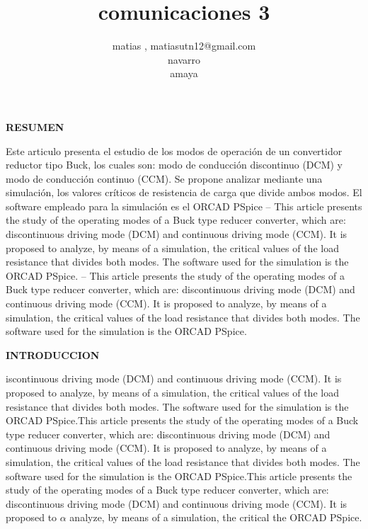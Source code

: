 \documentclass[10pt,a4paper]{article}
\author{matias , matiasutn12@gmail.com \\ navarro \\amaya \\ }
\title{comunicaciones 3}
\date{} %
\begin{document}
\maketitle  %
\begin{multicols}{2} %

\begin{center}
\textbf{RESUMEN }
\end{center}
Este articulo presenta el estudio de los modos de operación de un convertidor reductor tipo Buck, los cuales son: modo de conducción discontinuo (DCM) y modo de conducción continuo (CCM). Se propone analizar mediante una simulación, los valores críticos de resistencia de carga que divide ambos modos. El software empleado para la simulación es el ORCAD PSpice
– This article presents the study of the operating modes of a Buck type reducer converter, which are: discontinuous driving mode (DCM) and continuous driving mode (CCM). It is proposed to analyze, by means of a simulation, the critical values of the load resistance that divides both modes. The software used for the simulation is the ORCAD PSpice.
– This article presents the study of the operating modes of a Buck type reducer converter, which are: discontinuous driving mode (DCM) and continuous driving mode (CCM). It is proposed to analyze, by means of a simulation, the critical values of the load resistance that divides both modes. The software used for the simulation is the ORCAD PSpice.

\begin{center}  %
\textbf{INTRODUCCION}

\end{center} %
iscontinuous driving mode (DCM) and continuous driving mode (CCM). It is proposed to analyze, by means of a simulation, the critical values of the load resistance that divides both modes. The software used for the simulation is the ORCAD PSpice.This article presents the study of the operating modes of a Buck type reducer converter, which are: discontinuous driving mode (DCM) and continuous driving mode (CCM). It is proposed to analyze, by means of a simulation, the critical values of the load resistance that divides both modes. The software used for the simulation is the ORCAD PSpice.This article presents the study of the operating modes of a Buck type reducer converter, which are: discontinuous driving mode (DCM) and continuous driving mode (CCM). It is proposed to 
$\alpha$ analyze, by means of a simulation, the critical  the ORCAD PSpice.


\end{multicols}
\end{document}
